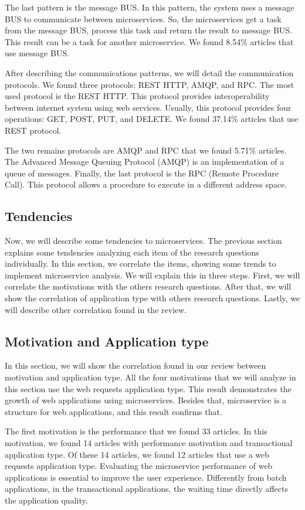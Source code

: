 The last pattern is the message BUS. In this pattern, the system uses a message BUS to communicate between microservices. So, the microservices get a task from the message BUS, process this task and return the result to message BUS. This result can be a task for another microservice. We found 8.54\% articles that use message BUS.

After describing the communications patterns, we will detail the communication protocols. We found three protocols: REST HTTP, AMQP, and RPC. The most used protocol is the REST HTTP. This protocol provides interoperability between internet system using web services. Usually, this protocol provides four operations: GET, POST, PUT, and DELETE. We found 37.14\% articles that use REST protocol. 

The two remains protocols are AMQP and RPC that we found 5.71\% articles. The Advanced Message Queuing Protocol (AMQP) is an implementation of a queue of messages. Finally, the last protocol is the RPC (Remote Procedure Call). This protocol allows a procedure to execute in a different address space.

\subsection{Tendencies}
Now, we will describe some tendencies to microservices. The previous section explains some tendencies analyzing each item of the research questions individually. In this section, we correlate the items, showing some trends to implement microservice analysis. We will explain this in three steps. First, we will correlate the motivations with the others research questions. After that, we will show the correlation of application type with others research questions. Lastly, we will describe other correlation found in the review.

\subsection{Motivation and Application type}
In this section, we will show the correlation found in our review between motivation and application type. All the four motivations that we will analyze in this section use the web requests application type. This result demonstrates the growth of web applications using microservices. Besides that, microservice is a structure for web applications, and this result confirms that.

The first motivation is the performance that we found 33 articles. In this motivation, we found 14 articles with performance motivation and transactional application type. Of these 14 articles, we found 12 articles that use a web requests application type. Evaluating the microservice performance of web applications is essential to improve the user experience. Differently from batch applications, in the transactional applications, the waiting time directly affects the application quality.

